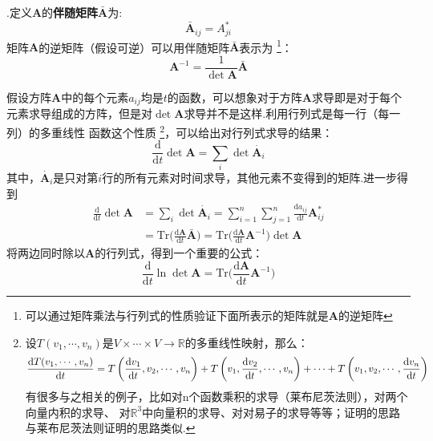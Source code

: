     .定义$\bm{A}$的\textbf{伴随矩阵}$\bar{\bm{A}}$为:
    \begin{equation}
        \bar{\bm{A}}_{ij} = A_{ji}^* 
    \end{equation}
    矩阵$\bm{A}$的逆矩阵（假设可逆）可以用伴随矩阵$\bar{\bm{A}}$表示为
    \footnote{可以通过矩阵乘法与行列式的性质验证下面所表示的矩阵就是$\bm{A}$的逆矩阵}：
    \begin{equation}
        \bm{A}^{-1} = \frac{1}{\det{\bm{A}}}\bm{\bar{A}}
    \end{equation}
    \par 
    假设方阵$\bm{A}$中的每个元素$a_{ij}$均是$t$的函数，可以想象对于方阵$\bm{A}$求导即是对于每个
    元素求导组成的方阵，但是对$\det \bm{A}$求导并不是这样.利用行列式是每一行（每一列）的多重线性
    函数这个性质
    \footnote{
        设$T(v_1,\cdots,v_n)$是$V\times\cdots\times V \to \mathbb{R}$的多重线性映射，那么：
        \begin{equation}
            \frac{\mathrm{d}{T(v_1,\cdots,v_n)}}{\mathrm{d}{t}} = T\left(\frac{\mathrm{d}{v_1}}{\mathrm{d}{t}}, v_2, \cdots, v_n\right) + T\left(v_1, \frac{\mathrm{d}{v_2}}{\mathrm{d}{t}}, \cdots, v_n\right)
             + \cdots + T\left(v_1, v_2, \cdots, \frac{\mathrm{d}{v_n}}{\mathrm{d}{t}}\right)
        \end{equation}
        有很多与之相关的例子，比如对n个函数乘积的求导（莱布尼茨法则），对两个向量内积的求导、
        对$\mathbb{R}^3$中向量积的求导、对对易子的求导等等；证明的思路与莱布尼茨法则证明的思路类似.
    }，可以给出对行列式求导的结果：
    \begin{equation}
        \frac {\mathrm{d}}{\mathrm{d}t} \det{\bm{A}} = \sum_i \det{\dot{\bm{A}_{i}}}
    \end{equation}
    其中，$\dot{\bm{A}_{i}}$是只对第$i$行的所有元素对时间求导，其他元素不变得到的矩阵.进一步得到
    \begin{equation}
        \begin{split}
            \frac {\mathrm{d}}{\mathrm{d}t} \det{\bm{A}} &= \sum_i \det{\dot{\bm{A}_i}} = \sum_{i=1}^n \sum_{j=1}^n \frac {\mathrm{d}a_{ij}}{\mathrm{d}t} \bm{A}_{ij}^*\\
        &= \mathrm{Tr} \bigg(\frac {\mathrm{d}\bm{A}}{\mathrm{d}t} \bar{\bm{A}}\bigg) = \mathrm{Tr} \bigg(\frac {\mathrm{d}\bm{A}}{\mathrm{d}t} \bm{A}^{-1}\bigg) \det{\bm{A}}
        \end{split}
    \end{equation}
    将两边同时除以$\bm{A}$的行列式，得到一个重要的公式：
    \begin{equation}
        \frac {\mathrm{d}}{\mathrm{d}t} \ln{\det{\bm{A}}} = \mathrm{Tr} \bigg(\frac {\mathrm{d}\bm{A}}{\mathrm{d}t} \bm{A}^{-1}\bigg)
    \end{equation}
